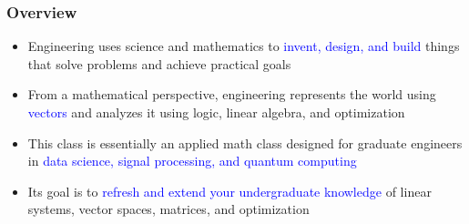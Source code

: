 \documentclass[10pt,english,aspectratio=169]{beamer}
\begin{document}
\begin{frame} \frametitle{Overview}

\begin{itemize}
  \setlength\itemsep{4mm}
  \item Engineering uses science and mathematics to \textcolor{blue}{invent, design, and build} things that solve problems and achieve practical goals
  
  \item From a mathematical perspective, engineering represents the world using \textcolor{blue}{vectors} and analyzes it using logic, linear algebra, and optimization
  
  \item This class is essentially an applied math class designed for graduate engineers in \textcolor{blue}{data science, signal processing, and quantum computing}
  
  \item Its goal is to \textcolor{blue}{refresh and extend your undergraduate knowledge} of linear systems, vector spaces, matrices, and optimization

\end{itemize}


		  
\end{frame}
\end{document}
